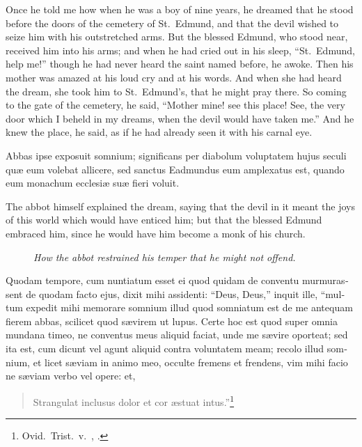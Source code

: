 \documentclass{book}
\newcommand{\blockhead}[4][]{
\begin{figure}
\centering
\vspace{#4}
\parbox{2.75cm}{\begin{center}\footnotesize \color{BrickRed} \emph{#2}\\ #1 \end{center}}
\end{figure}
}
\begin{document}
\begin{paracol}{2}
\begin{otherlanguage}{latin}
\end{otherlanguage}

\switchcolumn

Once he told me how when he was a boy of nine years, he dreamed that he stood before the doors of the cemetery of St.\ Edmund, and that the devil wished to seize him with his outstretched arms. But the blessed Edmund, who stood near, received him into his arms; and when he had cried out in his sleep, ``St.\ Edmund, help me!'' though he had never heard the saint named before, he awoke. Then his mother was amazed at his loud cry and at his words. And when she had heard the dream, she took him to St.\ Edmund's, that he might pray there. So coming to the gate of the cemetery, he said, ``Mother mine! see this place! See, the very door which I beheld in my dreams, when the devil would have taken me.'' And he knew the place, he said, as if he had already seen it with his carnal eye.

\switchcolumn*

\begin{otherlanguage}{latin}
Abbas ipse exposuit somnium; significans per diabolum voluptatem hujus seculi qu\ae{} eum volebat allicere, sed sanctus Eadmundus eum amplexatus est, quando eum monachum ecclesi\ae{} su\ae{} fieri voluit.
\end{otherlanguage}

\switchcolumn

The abbot himself explained the dream, saying that the devil in it meant the joys of this world which would have enticed him; but that the blessed Edmund embraced him, since he would have him become a monk of his church.

\switchcolumn*

\begin{otherlanguage}{latin}
\blockhead{How the abbot restrained his temper that he might not offend.}{4}{-0.45cm}
Quodam tempore, cum nuntiatum esset ei quod quidam de conventu murmurassent de quodam facto ejus, dixit mihi assidenti: ``Deus, Deus,'' inquit ille, ``multum expedit mihi memorare somnium illud quod somniatum est de me antequam fierem abbas, scilicet quod s\ae{}virem ut lupus. Certe hoc est quod super omnia mundana timeo, ne conventus meus aliquid faciat, unde me s\ae{}vire oporteat; sed ita est, cum dicunt vel agunt aliquid contra voluntatem meam; recolo illud somnium, et licet s\ae{}viam in animo meo, occulte fremens et frendens, vim mihi facio ne s\ae{}viam verbo vel opere: et,
\vspace{-0.5cm}
\begin{verse}
\footnotesize
Strangulat inclusus dolor et cor \ae{}stuat intus.''\footnote[\textdagger]{Ovid.\ Trist.\ v.\ , .}
\end{verse}


\end{otherlanguage}
\end{paracol}
\end{document}

